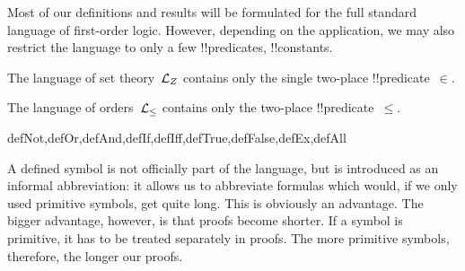 \documentclass[../../../include/open-logic-section]{subfiles}
\begin{document}
Most of our definitions and results will be formulated for the full
standard language of first-order logic.  However, depending on the
application, we may also restrict the language to only a few
!!{predicate}s, !!{constant}s.


\begin{ex}
The language of set theory~$\Lang L_Z$ contains only the single
two-place !!{predicate}~$\in$.
\end{ex}

\begin{ex}
The language of orders~$\Lang L_\le$ contains only the two-place
!!{predicate}~$\le$.
\end{ex}



\begin{tagblock}{defNot,defOr,defAnd,defIf,defIff,defTrue,defFalse,defEx,defAll}
\begin{explain}
A defined symbol is not officially part of the language, but is
introduced as an informal abbreviation: it allows us to abbreviate
formulas which would, if we only used primitive symbols, get quite
long.  This is obviously an advantage.  The bigger advantage, however,
is that proofs become shorter.  If a symbol is primitive, it has to be
treated separately in proofs. The more primitive symbols, therefore,
the longer our proofs.
\end{explain}
\end{tagblock}
\end{document}
